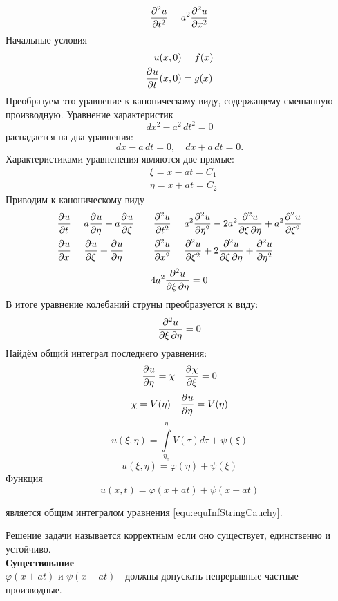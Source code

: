 \setcounter{equation}{0}
\begin{equation}
	\frac{\partial^{2}u}{\partial t^{2}} = a^2 \frac{\partial^{2}u}{\partial x^{2}} 
	\label{equ:equInfStringCauchy}
\end{equation}
Начальные условия 
\begin{alignat*}{1}
    u(x, 0) &= f(x)\\
    \frac{\partial^{}u}{\partial t^{}} (x, 0) &= g(x)
\end{alignat*}
Преобразуем это уравнение к каноническому виду, содержащему смешанную производную. Уравнение характеристик
\[
	dx^2 - a^2\, dt^2 = 0
\]
распадается на два уравнения:
\[
	dx - a\, dt = 0, \quad dx + a\, dt = 0.
\]
	Характеристиками уравненения являются две прямые:
\begin{align*}
	&\xi = x - at = C_1\\
	&\eta = x + at = C_2
\end{align*}
Приводим к каноническому виду
\begin{alignat*}{2}
	\frac{\partial^{}u}{\partial t^{}} &= a \frac{\partial^{}u}{\partial \eta^{}} - a \frac{\partial^{}u}{\partial \xi^{}} \quad &\frac{\partial^{2}u}{\partial t^{2}} &= a^2 \frac{\partial^{2}u}{\partial \eta^{2}} - 2 a^2 \frac{\partial^2u}{\partial \xi\, \partial \eta} + a^2 \frac{\partial^{2}u}{\partial \xi^{2}}\\
	\frac{\partial^{}u}{\partial x^{}} &=\frac{\partial^{}u}{\partial \xi^{}} + \frac{\partial^{}u}{\partial \eta^{}} \quad &\frac{\partial^{2}u}{\partial x^{2}} &= \frac{\partial^{2}u}{\partial \xi^{2}} + 2 \frac{\partial^2u}{\partial \xi\, \partial \eta} + \frac{\partial^{2}u}{\partial \eta^{2}}
\end{alignat*}
\[
	4 a^2 \frac{\partial^2u}{\partial \xi\, \partial \eta} = 0
\]
В итоге уравнение колебаний струны преобразуется к виду:
\[
	\frac{\partial^2u}{\partial \xi\, \partial \eta} = 0
\]
Найдём общий интеграл последнего уравнения:
\[
	\frac{\partial^{}u}{\partial \eta^{}} = \chi \quad \frac{\partial^{}\chi}{\partial \xi^{}} = 0
\]
\[
	\chi =V(\eta) \quad \frac{\partial^{}u}{\partial \eta^{}} = V(\eta)
\]
\[
	u(\xi, \eta)= \int\limits_{\eta_0}^{\eta} V(\tau) d \tau + \psi(\xi)
\]
\[
	u(\xi, \eta) = \varphi(\eta) + \psi (\xi)
\]
Функция
\begin{equation}
      u(x,t) = \varphi (x +at) + \psi (x - at)
	\label{equ:equCommonIntegral}
\end{equation}	

является общим интегралом уравнения \eqref{equ:equInfStringCauchy}.

Решение задачи называется корректным если оно существует, единственно и устойчиво.\\

\textbf{Существование}\\
	$\varphi(x +at)$ и $\psi(x - at)$ - должны допускать непрерывные частные производные.\\


